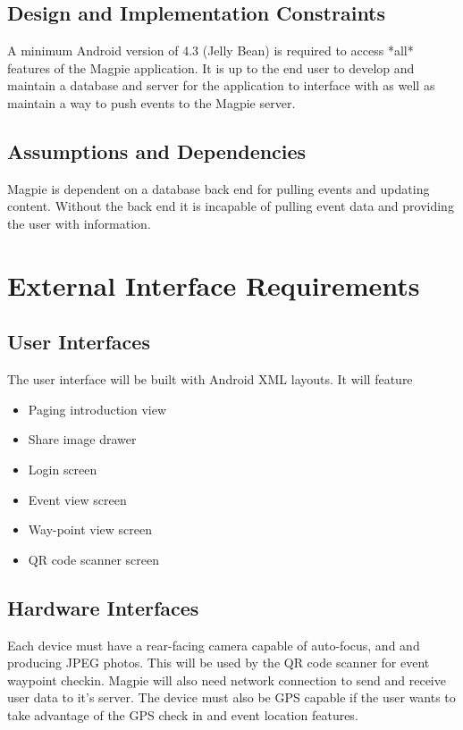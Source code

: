 \documentclass{scrreprt}
\begin{document}
\section{Design and Implementation Constraints}
A minimum Android version of 4.3 (Jelly Bean) is required to access *all* features of the Magpie application. It is up to the end user to develop and maintain a database and server for the application to interface with as well as maintain a way to push events to the Magpie server.

\section{Assumptions and Dependencies}
Magpie is dependent on a database back end for pulling events and updating
content. Without the back end it is incapable of pulling event data and
providing the user with information.


\chapter{External Interface Requirements}

\section{User Interfaces}

The user interface will be built with Android XML layouts. It will feature
\begin{itemize}
\item Paging introduction view
\item Share image drawer
\item Login screen
\item Event view screen
\item Way-point view screen
\item QR code scanner screen
\end{itemize}

\section{Hardware Interfaces}
Each device must have a rear-facing camera capable of auto-focus,
and and producing JPEG photos. This will be used by the QR code scanner for event waypoint checkin.
Magpie will also need network connection to send and receive user data to it's server.
The device must also be GPS capable if the user wants to take advantage of the GPS check in and event location features.
\end{document}
